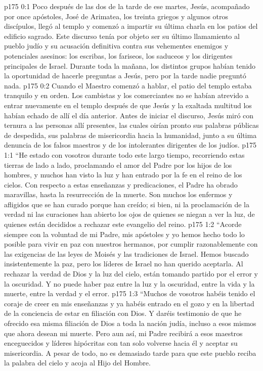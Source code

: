 \author{Comisión de seres intermedios}
\vs p175 0:1 Poco después de las dos de la tarde de ese martes, Jesús, acompañado por once apóstoles, José de Arimatea, los treinta griegos y algunos otros discípulos, llegó al templo y comenzó a impartir su última charla en los patios del edificio sagrado. Este discurso tenía por objeto ser su último llamamiento al pueblo judío y su acusación definitiva contra sus vehementes enemigos y potenciales asesinos: los escribas, los fariseos, los saduceos y los dirigentes principales de Israel. Durante toda la mañana, los distintos grupos habían tenido la oportunidad de hacerle preguntas a Jesús, pero por la tarde nadie preguntó nada.
\vs p175 0:2 Cuando el Maestro comenzó a hablar, el patio del templo estaba tranquilo y en orden. Los cambistas y los comerciantes no se habían atrevido a entrar nuevamente en el templo después de que Jesús y la exaltada multitud los habían echado de allí el día anterior. Antes de iniciar el discurso, Jesús miró con ternura a las personas allí presentes, las cuales oirían pronto sus palabras públicas de despedida, sus palabras de misericordia hacia la humanidad, junto a su última denuncia de los falsos maestros y de los intolerantes dirigentes de los judíos.
\vs p175 1:1 “He estado con vosotros durante todo este largo tiempo, recorriendo estas tierras de lado a lado, proclamando el amor del Padre por los hijos de los hombres, y muchos han visto la luz y han entrado por la fe en el reino de los cielos. Con respecto a estas enseñanzas y predicaciones, el Padre ha obrado maravillas, hasta la resurrección de la muerte. Son muchos los enfermos y afligidos que se han curado porque han creído; si bien, ni la proclamación de la verdad ni las curaciones han abierto los ojos de quienes se niegan a ver la luz, de quienes están decididos a rechazar este evangelio del reino.
\vs p175 1:2 “Acorde siempre con la voluntad de mi Padre, mis apóstoles y yo hemos hecho todo lo posible para vivir en paz con nuestros hermanos, por cumplir razonablemente con las exigencias de las leyes de Moisés y las tradiciones de Israel. Hemos buscado insistentemente la paz, pero los líderes de Israel no han querido aceptarla. Al rechazar la verdad de Dios y la luz del cielo, están tomando partido por el error y la oscuridad. Y no puede haber paz entre la luz y la oscuridad, entre la vida y la muerte, entre la verdad y el error.
\vs p175 1:3 “Muchos de vosotros habéis tenido el coraje de creer en mis enseñanzas y ya habéis entrado en el gozo y en la libertad de la conciencia de estar en filiación con Dios. Y daréis testimonio de que he ofrecido esa misma filiación de Dios a toda la nación judía, incluso a esos mismos que ahora desean mi muerte. Pero aun así, mi Padre recibirá a esos maestros enceguecidos y líderes hipócritas con tan solo volverse hacia él y aceptar su misericordia. A pesar de todo, no es demasiado tarde para que este pueblo reciba la palabra del cielo y acoja al Hijo del Hombre.
